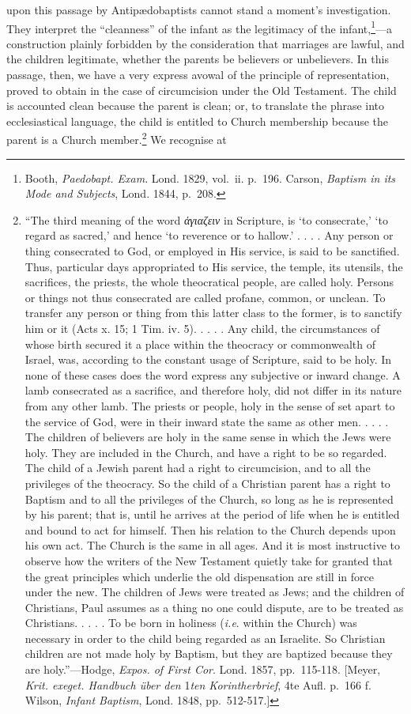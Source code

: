 \documentclass[]{book}
\begin{document}
upon this passage by Antipædobaptists cannot stand a moment's investigation. They interpret the ``cleanness'' of the infant as the legitimacy of the infant,\footnote{Booth, \emph{Paedobapt. Exam}. Lond. 1829, vol.~ii. p.~196. Carson, \emph{Baptism in its Mode and Subjects}, Lond. 1844, p.~208.}---a construction plainly forbidden by the consideration that marriages are lawful, and the children legitimate, whether the parents be believers or unbelievers. In this passage, then, we have a very express avowal of the principle of representation, proved to obtain in the case of circumcision under the Old Testament. The child is accounted clean because the parent is clean; or, to translate the phrase into ecclesiastical language, the child is entitled to Church membership because the parent is a Church member.\footnote{``The third meaning of the word \emph{ἁγιαζειν} in Scripture, is `to consecrate,' `to regard as sacred,' and hence `to reverence or to hallow.' . . . . Any person or thing consecrated to God, or employed in His service, is said to be sanctified. Thus, particular days appropriated to His service, the temple, its utensils, the sacrifices, the priests, the whole theocratical people, are called holy. Persons or things not thus consecrated are called profane, common, or unclean. To transfer any person or thing from this latter class to the former, is to sanctify him or it (Acts x. 15; 1 Tim. iv. 5). . . . . Any child, the circumstances of whose birth secured it a place within the theocracy or commonwealth of Israel, was, according to the constant usage of Scripture, said to be holy. In none of these cases does the word express any subjective or inward change. A lamb consecrated as a sacrifice, and therefore holy, did not differ in its nature from any other lamb. The priests or people, holy in the sense of set apart to the service of God, were in their inward state the same as other men. . . . . The children of believers are holy in the same sense in which the Jews were holy. They are included in the Church, and have a right to be so regarded. The child of a Jewish parent had a right to circumcision, and to all the privileges of the theocracy. So the child of a Christian parent has a right to Baptism and to all the privileges of the Church, so long as he is represented by his parent; that is, until he arrives at the period of life when he is entitled and bound to act for himself. Then his relation to the Church depends upon his own act. The Church is the same in all ages. And it is most instructive to observe how the writers of the New Testament quietly take for granted that the great principles which underlie the old dispensation are still in force under the new. The children of Jews were treated as Jews; and the children of Christians, Paul assumes as a thing no one could dispute, are to be treated as Christians. . . . . To be born in holiness (\emph{i.e}. within the Church) was necessary in order to the child being regarded as an Israelite. So Christian children are not made holy by Baptism, but they are baptized because they are holy.''---Hodge, \emph{Expos. of First Cor}. Lond. 1857, pp.~115-118. {[}Meyer, \emph{Krit. exeget. Handbuch über den} 1\emph{ten Korintherbrief}, 4te Aufl. p.~166 f. Wilson, \emph{Infant Baptism}, Lond. 1848, pp.~512-517.{]}} We recognise at 
\end{document}
